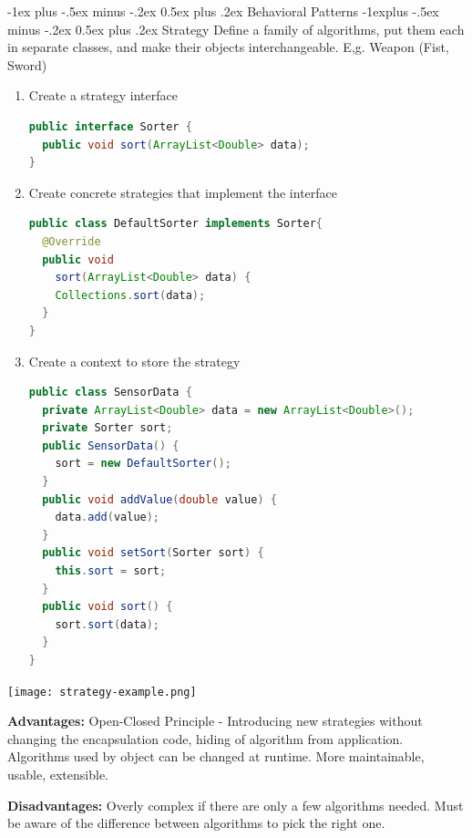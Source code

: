 \documentclass[letterpaper, 8pt]{extarticle}
\makeatletter
\renewcommand{\section}{\@startsection{section}{1}{0mm}%
                                {-1ex plus -.5ex minus -.2ex}%
                                {0.5ex plus .2ex}%
                                {\normalfont\normalsize\bfseries}}
\renewcommand{\subsection}{\@startsection{subsection}{2}{0mm}%
                                {-1explus -.5ex minus -.2ex}%
                                {0.5ex plus .2ex}%
                                {\normalfont\small\bfseries}}
\makeatother
\begin{document}
\begin{multicols*}{5}
  \section{Behavioral Patterns}
  \subsection{Strategy}
  Define a family of algorithms, put them each in separate classes,
  and make their objects interchangeable. E,g. Weapon (Fist, Sword)
  \begin{enumerate}
    \item Create a strategy interface
          \begin{lstlisting}[language=Java, breaklines=true]
public interface Sorter {
  public void sort(ArrayList<Double> data);
}
        \end{lstlisting}
    \item Create concrete strategies that implement the interface
          \begin{lstlisting}[language=Java, breaklines=true]
public class DefaultSorter implements Sorter{
  @Override
  public void 
    sort(ArrayList<Double> data) {
    Collections.sort(data);
  }
}
        \end{lstlisting}
    \item Create a context to store the strategy
          \begin{lstlisting}[language=Java, breaklines=true]
public class SensorData {
  private ArrayList<Double> data = new ArrayList<Double>();
  private Sorter sort;
  public SensorData() {
    sort = new DefaultSorter();
  }
  public void addValue(double value) {
    data.add(value);
  }
  public void setSort(Sorter sort) {
    this.sort = sort;
  }
  public void sort() {
    sort.sort(data);
  }
}

        \end{lstlisting}
  \end{enumerate}
  \begin{center}
    \texttt{[image: strategy-example.png]}
  \end{center}

  \textbf{Advantages:}
  Open-Closed Principle - Introducing new strategies without changing the encapsulation code,
  hiding of algorithm from application.
  Algorithms used by object can be changed at runtime.
  More maintainable, usable, extensible.

  \textbf{Disadvantages:}
  Overly complex if there are only a few algorithms needed.
  Must be aware of the difference between algorithms to pick the right one.


\end{multicols*}
\end{document}
